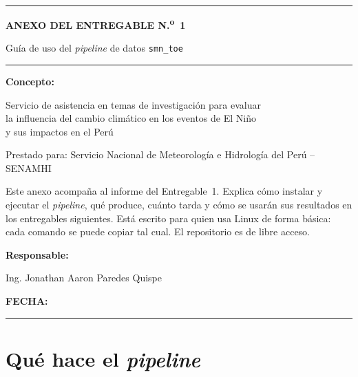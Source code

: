 \documentclass[11pt,a4paper]{article}
\begin{document}
\begin{titlepage}
\centering
\noindent\rule{\textwidth}{0.6pt}
\vspace{1.4cm}

{\Large\bfseries ANEXO DEL ENTREGABLE N.\textsuperscript{o}~1\par}
\vspace{0.6cm}
{\large Guía de uso del \emph{pipeline} de datos \texttt{smn\_toe}\par}
\vspace{1.2cm}
\rule{0.7\textwidth}{0.6pt}
\vspace{1.2cm}

{\normalsize\bfseries Concepto:\par}
\vspace{0.3cm}
{\normalsize Servicio de asistencia en temas de investigación para evaluar\\
la influencia del cambio climático en los eventos de El Niño\\
y sus impactos en el Perú\par}
\vspace{1.2cm}
{\small Prestado para: Servicio Nacional de Meteorología e Hidrología del Perú -- SENAMHI\par}
\vspace{1.2cm}
\begin{minipage}{0.8\textwidth}\small\centering
Este anexo acompaña al informe del Entregable~1. Explica cómo instalar y ejecutar el \emph{pipeline}, qué produce, cuánto tarda y cómo se usarán sus resultados en los entregables siguientes. Está escrito para quien usa Linux de forma básica: cada comando se puede copiar tal cual. El repositorio es de libre acceso.
\end{minipage}
\vfill
{\small\bfseries Responsable:\par}
{\small Ing. Jonathan Aaron Paredes Quispe\par}
\vspace{0.4cm}
{\small\bfseries FECHA: \fechaentrega\par}
\vspace{0.6cm}
\noindent\rule{\textwidth}{0.6pt}
\end{titlepage}

\tableofcontents
\clearpage

\section{Qué hace el \emph{pipeline}}
\end{document}
